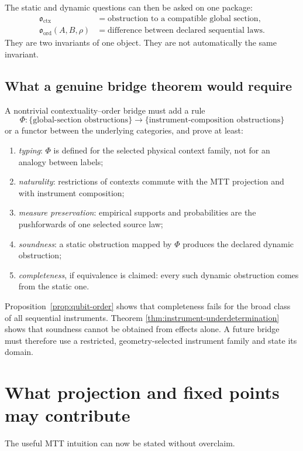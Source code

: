 \documentclass[11pt]{article}
\begin{document}
The static and dynamic questions can then be asked on one package:
\begin{align*}
\mathfrak{o}_{\mathrm{ctx}}
&=\text{obstruction to a compatible global section},\\
\mathfrak{o}_{\mathrm{ord}}(A,B,\rho)
&=\text{difference between declared sequential laws}.
\end{align*}
They are two invariants of one object. They are not automatically the same
invariant.

\subsection{What a genuine bridge theorem would require}

A nontrivial contextuality--order bridge must add a rule
\[
\Phi:
\{\text{global-section obstructions}\}
\longrightarrow
\{\text{instrument-composition obstructions}\}
\]
or a functor between the underlying categories, and prove at least:
\begin{enumerate}
\item \emph{typing}: \(\Phi\) is defined for the selected physical context
family, not for an analogy between labels;
\item \emph{naturality}: restrictions of contexts commute with the MTT
projection and with instrument composition;
\item \emph{measure preservation}: empirical supports and probabilities are
the pushforwards of one selected source law;
\item \emph{soundness}: a static obstruction mapped by \(\Phi\) produces the
declared dynamic obstruction;
\item \emph{completeness}, if equivalence is claimed: every such dynamic
obstruction comes from the static one.
\end{enumerate}

Proposition~\ref{prop:qubit-order} shows that completeness fails for the broad
class of all sequential instruments. Theorem
\ref{thm:instrument-underdetermination} shows that soundness cannot be obtained
from effects alone. A future bridge must therefore use a restricted,
geometry-selected instrument family and state its domain.

\section{What projection and fixed points may contribute}

The useful MTT intuition can now be stated without overclaim.
\end{document}
